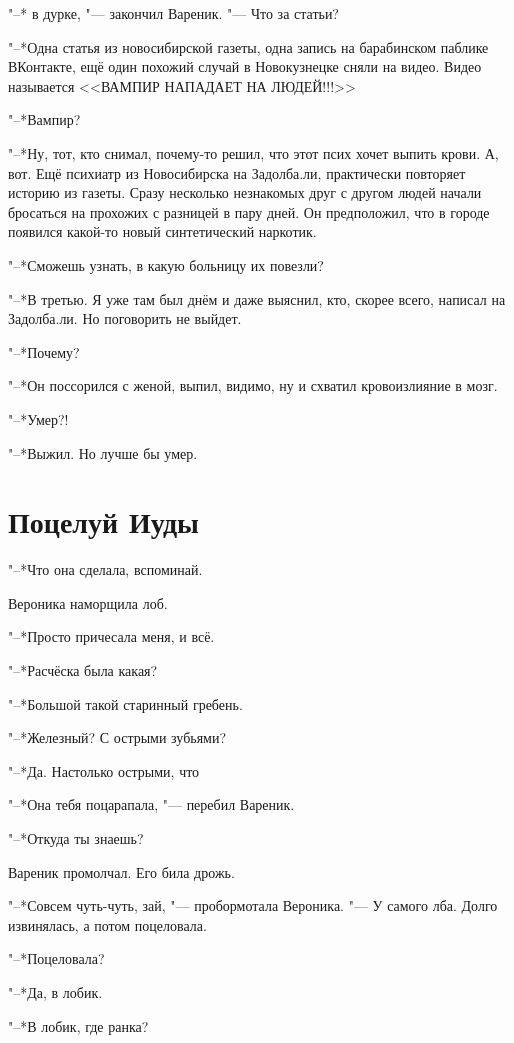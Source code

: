 "--* \ldotst в дурке, "--- закончил Вареник.
"--- Что за статьи?

"--*Одна статья из новосибирской газеты, одна запись на барабинском паблике ВКонтакте, ещё один похожий случай в Новокузнецке сняли на видео.
Видео называется <<ВАМПИР НАПАДАЕТ НА ЛЮДЕЙ!!!>>

"--*Вампир?

"--*Ну, тот, кто снимал, почему-то решил, что этот псих хочет выпить крови.
А, вот.
Ещё психиатр из Новосибирска на Задолба.ли, практически повторяет историю из газеты.
Сразу несколько незнакомых друг с другом людей начали бросаться на прохожих с разницей в пару дней.
Он предположил, что в городе появился какой-то новый синтетический наркотик.

"--*Сможешь узнать, в какую больницу их повезли?

"--*В третью.
Я уже там был днём и даже выяснил, кто, скорее всего, написал на Задолба.ли.
Но поговорить не выйдет.

"--*Почему?

"--*Он поссорился с женой, выпил, видимо, ну и схватил кровоизлияние в мозг.

"--*Умер?!

"--*Выжил.
Но лучше бы умер.

\section{Поцелуй Иуды}

"--*Что она сделала, вспоминай.

Вероника наморщила лоб.

"--*Просто причесала меня, и всё.

"--*Расчёска была какая?

"--*Большой такой старинный гребень.

"--*Железный?
С острыми зубьями?

"--*Да.
Настолько острыми, что\ldotst

"--*Она тебя поцарапала, "--- перебил Вареник.

"--*Откуда ты знаешь?

Вареник промолчал.
Его била дрожь.

"--*Совсем чуть-чуть, зай, "--- пробормотала Вероника.
"--- У самого лба.
Долго извинялась, а потом поцеловала.

"--*Поцеловала?

"--*Да, в лобик.

"--*В лобик, где ранка?


